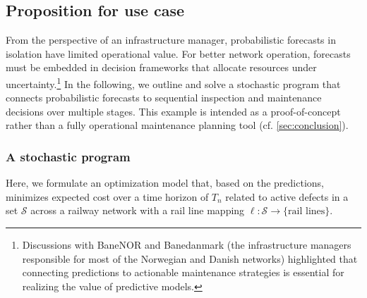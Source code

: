 \documentclass{article}
\providecommand{\DIFadd}[1]{{\protect\color{blue} \sf #1}} %
\providecommand{\DIFaddbegin}{} %
\providecommand{\DIFaddend}{} %
\begin{document}
\subsection{Proposition for use case} \label{sec:proposition_for_use}
From the perspective of an infrastructure manager, probabilistic forecasts in isolation have limited operational value. 
For better network operation, forecasts must be embedded in decision frameworks that allocate resources under uncertainty.\footnote{Discussions with BaneNOR and Banedanmark (the infrastructure managers responsible for most of the Norwegian and Danish networks) highlighted that connecting predictions to actionable maintenance strategies is essential for realizing the value of predictive models.}
In the following, we outline and solve a stochastic program that connects probabilistic forecasts to sequential inspection and maintenance decisions over multiple stages. \DIFaddbegin \DIFadd{This example is intended as a proof-of-concept rather than a fully operational maintenance planning tool (cf. \cref{sec:conclusion}).
}\DIFaddend 


\subsubsection{A stochastic program}
Here, we formulate an optimization model that, based on the predictions, minimizes expected cost over a time horizon of $T_n$ related to active defects in a set $\mathcal{S}$ across a railway network with a rail line mapping $\ell:\mathcal{S}\to\{\text{rail lines}\}$.
\end{document}
